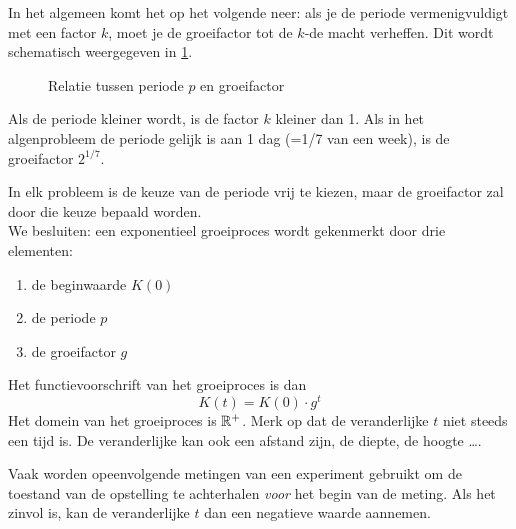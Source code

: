 In het algemeen komt het op het volgende neer: als je de periode vermenigvuldigt met een factor $k$, moet je de groeifactor tot de $k$-de macht verheffen. Dit wordt schematisch weergegeven in \cref{fig:periode_factor}.
\begin{figure}[tbp]
    \centering
{}
    \caption{Relatie tussen periode $p$ en groeifactor}
    \label{fig:periode_factor}
\end{figure}
Als de periode kleiner wordt, is de factor $k$ kleiner dan 1. Als in het algenprobleem de periode gelijk is aan 1 dag (=1/7 van een week), is de groeifactor $2^{1/7}$.

In elk probleem is de
keuze van de periode vrij te kiezen, maar de groeifactor zal door die
keuze bepaald worden.\\


We besluiten: een exponentieel groeiproces wordt gekenmerkt door drie elementen:
\begin{enumerate}
\item de beginwaarde $K(0)$
\item de periode $p$
\item de groeifactor $g$
\end{enumerate}
Het functievoorschrift van het groeiproces is dan 
\begin{equation}
K(t)=K(0)\cdot g^t
\label{eq:exp_groei}
\end{equation}
Het domein van het groeiproces is $\mathbb{R}^+$.
Merk op dat de veranderlijke $t$ niet steeds een tijd is. De veranderlijke kan ook een afstand zijn, de diepte, de hoogte \dots.

Vaak worden opeenvolgende metingen van een experiment gebruikt om de toestand van de opstelling te achterhalen  \emph{voor} het begin van de meting. Als het zinvol is, kan de veranderlijke $t$ dan een negatieve waarde aannemen. 

